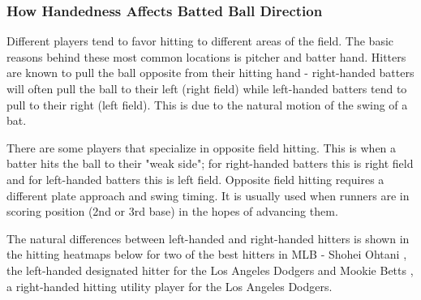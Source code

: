 \documentclass{article}
\begin{document}
\subsubsection{How Handedness Affects Batted Ball Direction}
Different players tend to favor hitting to different areas of the field. \cite{mlb2023left-handedpitching,} The basic reasons behind these most common locations is pitcher and batter hand. Hitters are known to pull the ball opposite from their hitting hand - right-handed batters will often pull the ball to their left (right field) while left-handed batters tend to pull to their right (left field). This is due to the natural motion of the swing of a bat. 

There are some players that specialize in opposite field hitting. \cite{ignitebaseball2023pullswing} This is when a batter hits the ball to their "weak side"; for right-handed batters this is right field and for left-handed batters this is left field. Opposite field hitting requires a different plate approach and swing timing. It is usually used when runners are in scoring position (2nd or 3rd base) in the hopes of advancing them.

The natural differences between left-handed and right-handed hitters is shown in the hitting heatmaps below for two of the best hitters in MLB - Shohei Ohtani \cite{mlbsavant2023ohtani}, the left-handed designated hitter for the Los Angeles Dodgers and Mookie Betts \cite{mlbsavant2023betts}, a right-handed hitting utility player for the Los Angeles Dodgers.
\end{document}
